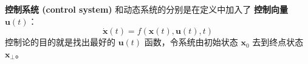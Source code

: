 \documentclass[orivec]{llncs}
\makeatletter
\newcommand{\emp}[1]{\textbf{\textcolor{Cerulean}{#1}}}
\newcommand{\vect}[1]{\boldsymbol{#1}}
\renewcommand{\boxed}[1]{\fbox{\m@th$\displaystyle\scalebox{0.9}{#1}$} \,}
\makeatother
\begin{document}






\emp{控制系统 (control system)} 和动态系统的分别是在定义中加入了 \emp{控制向量}  $\vect{u}(t)$：
\begin{equation}
\dot{\vect{x}}(t) = f(\vect{x}(t), \vect{u}(t), t)
\end{equation}
控制论的目的就是找出最好的 $\vect{u}(t)$ 函数，令系统由初始状态 $\vect{x}_0$ 去到终点状态 $\vect{x_\bot}$。
\end{document}
